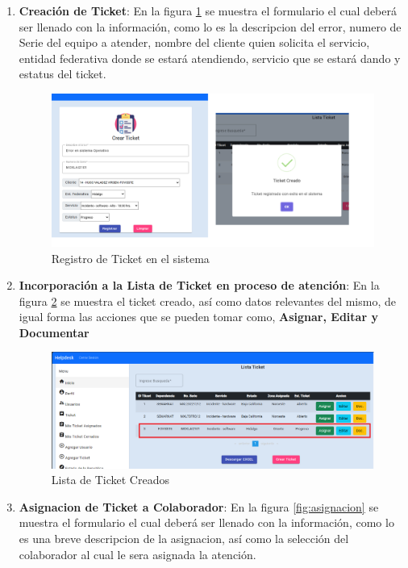 \begin{enumerate}
	\item  \textbf{Creación de Ticket}:
	En la figura \ref{fig:ticketdrw} se muestra el formulario el cual deberá ser llenado con la información, como lo es la descripcion del error, numero de Serie del equipo a atender, nombre del cliente quien solicita el servicio, entidad federativa donde se estará atendiendo, servicio que se estará dando y estatus del ticket.
	 \begin{figure}[H]
		\centering
		\includegraphics[width=1.1\textwidth]{Capitulo7/Img/creaticket}
		\caption{Registro de Ticket en el sistema}
		\label{fig:ticketdrw}
	\end{figure}
\item  \textbf{Incorporación a la Lista de Ticket en proceso de atención}:
	En la figura \ref{fig:ListaTicket} se muestra el ticket creado, así como datos relevantes del mismo,  de igual forma las acciones que se pueden tomar como, \textbf{Asignar, Editar y Documentar}
	
	\begin{figure}[H]
		\centering
		\includegraphics[width=1.1\textwidth]{Capitulo7/Img/ListaTicket}
		\caption{Lista de Ticket Creados}
		\label{fig:ListaTicket}
	\end{figure}



\item  \textbf{Asignacion de Ticket a Colaborador}:
En la figura \ref{fig:asignacion} se muestra el formulario el cual deberá ser llenado con la información, como lo es una breve descripcion de la asignacion, así como la selección del colaborador al cual le sera asignada la atención. 


\end{enumerate}
